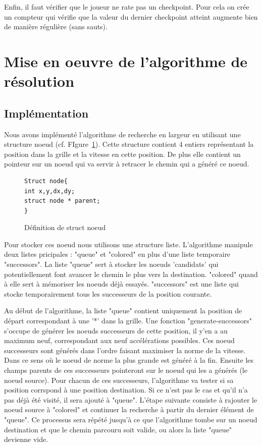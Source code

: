 Enfin, il faut vérifier que le joueur ne rate pas un checkpoint. Pour cela on crée un compteur qui vérifie que la valeur du dernier checkpoint atteint augmente bien de manière régulière (sans sauts). 

\section{Mise en oeuvre de l'algorithme de résolution}
\subsection{Implémentation}
Nous avons implémenté l'algorithme de recherche en largeur en utilisant une structure noeud (cf. FIgure~\ref{noeud}). Cette structure contient 4 entiers représentant la position dans la grille et la vitesse en cette position. De plus elle contient un pointeur sur un noeud qui va servir à retracer le chemin qui a généré ce noeud.

\begin{figure}[h]
\centering
\begin{minipage}[c]{0.5\linewidth}
\begin{verbatim}
Struct node{
int x,y,dx,dy;
struct node * parent;
}
\end{verbatim}
\end{minipage}
\caption{Définition de struct noeud}
\label{noeud}
\end{figure}
Pour stocker ces noeud nous utilisons une structure liste. L'algorithme manipule deux listes pricipales : "queue" et "colored" en plus d'une liste temporaire "successors". La liste "queue" sert à stocker les noeuds 'candidats' qui potentiellement font avancer le chemin le plus vers la destination. "colored" quand à elle sert à mémoriser les noeuds déjà essayés. "successors" est une liste qui stocke temporairement tous les successeurs de la position courante.

Au début de l'algorithme, la liste "queue" contient uniquement la position de départ correspondant à une '*' dans la grille. Une fonction "generate-successors" s'occupe de générer les noeuds successeurs de cette position, il y'en a au maximum neuf, correspondant aux neuf accélérations possibles. Ces noeud successeurs sont générés dans l'ordre faisant maximiser la norme de la vitesse. Dans ce sens où le noeud de norme la plus grande est généré à la fin. Ensuite les champs parents de ces successeurs pointeront sur le noeud qui les a générés (le noeud source). Pour chacun de ces successeurs, l'algorithme va tester si sa position corrspond à une position destination. Si ce n'est pas le cas et qu'il n'a pas déjà été visité, il sera ajouté à "queue". L'étape suivante consiste à rajouter le noeud source à "colored" et continuer la recherche à partir du dernier élément de "queue". Ce processus sera répété jusqu'à ce que l'algorithme tombe sur un noeud destination et que le chemin parcouru soit valide, ou alors la liste "queue" devienne vide. 

